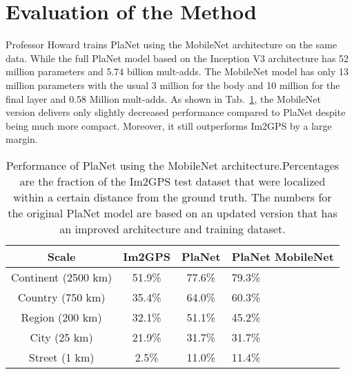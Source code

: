 \documentclass[twocolumn]{article}
\begin{document}
 \section{Evaluation of the Method}
   Professor Howard trains PlaNet using the MobileNet architecture on the same data. While the full PlaNet model based on the Inception V3 architecture \cite{Szegedy2016Rethinking} has 52 million parameters and 5.74 billion mult-adds. The MobileNet model has only 13 million parameters with the usual 3 million for the body and 10 million for the final layer and 0.58 Million mult-adds. As shown in Tab.~\ref{Performance}, the MobileNet version delivers only slightly decreased performance compared to PlaNet despite being much more compact. Moreover, it still outperforms Im2GPS by a large margin.
   \begin{table}[h]
   	\centering
   	\caption{Performance of PlaNet\cite{Weyand2016PlaNet} using the MobileNet architecture.Percentages are the fraction of the Im2GPS\cite{Choi2015Multimodal} test dataset that were localized within a certain distance from the ground truth. The numbers for the original PlaNet model are based on an updated version that has an improved architecture and training dataset.}\label{Performance}
   	\begin{tabular}{|c|c|c|p{1.6cm}|}
   		\hline
   		Scale & Im2GPS & PlaNet& PlaNet MobileNet\\
   		\hline
   		Continent (2500 km)  &51.9\% &77.6\%& 79.3\%  \\
   		\hline
   		Country (750 km) &35.4\%&64.0\%&60.3\% \\
   		\hline
   		Region (200 km) &32.1\%&51.1\%& 45.2\%\\
   		\hline
   	    City (25 km)&21.9\%&31.7\%& 31.7\%\\
   		\hline
   		Street (1 km) &2.5\%&11.0\%& 11.4\%\\
   		\hline
   	\end{tabular}
   \end{table}
  

	
\end{document}
